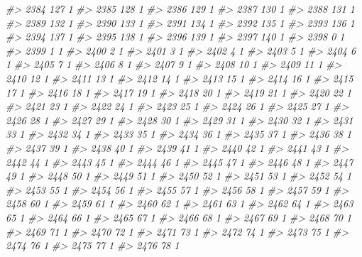 \documentclass[]{article}
\newenvironment{Shaded}{\begin{snugshade}}{\end{snugshade}}
\newcommand{\CommentTok}[1]{\textcolor[rgb]{0.56,0.35,0.01}{\textit{#1}}}
\begin{document}
\begin{Shaded}
\begin{Highlighting}[]
\CommentTok{#> 2384 127  1}
\CommentTok{#> 2385 128  1}
\CommentTok{#> 2386 129  1}
\CommentTok{#> 2387 130  1}
\CommentTok{#> 2388 131  1}
\CommentTok{#> 2389 132  1}
\CommentTok{#> 2390 133  1}
\CommentTok{#> 2391 134  1}
\CommentTok{#> 2392 135  1}
\CommentTok{#> 2393 136  1}
\CommentTok{#> 2394 137  1}
\CommentTok{#> 2395 138  1}
\CommentTok{#> 2396 139  1}
\CommentTok{#> 2397 140  1}
\CommentTok{#> 2398   0  1}
\CommentTok{#> 2399   1  1}
\CommentTok{#> 2400   2  1}
\CommentTok{#> 2401   3  1}
\CommentTok{#> 2402   4  1}
\CommentTok{#> 2403   5  1}
\CommentTok{#> 2404   6  1}
\CommentTok{#> 2405   7  1}
\CommentTok{#> 2406   8  1}
\CommentTok{#> 2407   9  1}
\CommentTok{#> 2408  10  1}
\CommentTok{#> 2409  11  1}
\CommentTok{#> 2410  12  1}
\CommentTok{#> 2411  13  1}
\CommentTok{#> 2412  14  1}
\CommentTok{#> 2413  15  1}
\CommentTok{#> 2414  16  1}
\CommentTok{#> 2415  17  1}
\CommentTok{#> 2416  18  1}
\CommentTok{#> 2417  19  1}
\CommentTok{#> 2418  20  1}
\CommentTok{#> 2419  21  1}
\CommentTok{#> 2420  22  1}
\CommentTok{#> 2421  23  1}
\CommentTok{#> 2422  24  1}
\CommentTok{#> 2423  25  1}
\CommentTok{#> 2424  26  1}
\CommentTok{#> 2425  27  1}
\CommentTok{#> 2426  28  1}
\CommentTok{#> 2427  29  1}
\CommentTok{#> 2428  30  1}
\CommentTok{#> 2429  31  1}
\CommentTok{#> 2430  32  1}
\CommentTok{#> 2431  33  1}
\CommentTok{#> 2432  34  1}
\CommentTok{#> 2433  35  1}
\CommentTok{#> 2434  36  1}
\CommentTok{#> 2435  37  1}
\CommentTok{#> 2436  38  1}
\CommentTok{#> 2437  39  1}
\CommentTok{#> 2438  40  1}
\CommentTok{#> 2439  41  1}
\CommentTok{#> 2440  42  1}
\CommentTok{#> 2441  43  1}
\CommentTok{#> 2442  44  1}
\CommentTok{#> 2443  45  1}
\CommentTok{#> 2444  46  1}
\CommentTok{#> 2445  47  1}
\CommentTok{#> 2446  48  1}
\CommentTok{#> 2447  49  1}
\CommentTok{#> 2448  50  1}
\CommentTok{#> 2449  51  1}
\CommentTok{#> 2450  52  1}
\CommentTok{#> 2451  53  1}
\CommentTok{#> 2452  54  1}
\CommentTok{#> 2453  55  1}
\CommentTok{#> 2454  56  1}
\CommentTok{#> 2455  57  1}
\CommentTok{#> 2456  58  1}
\CommentTok{#> 2457  59  1}
\CommentTok{#> 2458  60  1}
\CommentTok{#> 2459  61  1}
\CommentTok{#> 2460  62  1}
\CommentTok{#> 2461  63  1}
\CommentTok{#> 2462  64  1}
\CommentTok{#> 2463  65  1}
\CommentTok{#> 2464  66  1}
\CommentTok{#> 2465  67  1}
\CommentTok{#> 2466  68  1}
\CommentTok{#> 2467  69  1}
\CommentTok{#> 2468  70  1}
\CommentTok{#> 2469  71  1}
\CommentTok{#> 2470  72  1}
\CommentTok{#> 2471  73  1}
\CommentTok{#> 2472  74  1}
\CommentTok{#> 2473  75  1}
\CommentTok{#> 2474  76  1}
\CommentTok{#> 2475  77  1}
\CommentTok{#> 2476  78  1}

\end{Highlighting}
\end{Shaded}
\end{document}
